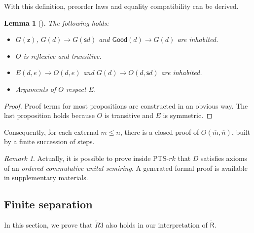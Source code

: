 \documentclass{article}
\newtheorem{lemma}{Lemma}
\theoremstyle{definition}
\theoremstyle{remark}
\newtheorem*{remark}{Remark}
\newcommand{\Rt}{\widetilde{\mathsf R}}
\newcommand{\Good}{\mathsf{Good}}
\newcommand{\z}{\mathsf z}
\newcommand{\suc}{\mathsf s}
\begin{document}
With this definition, preorder laws and equality
compatibility can be derived.

\begin{lemma}
    []
    \label{r-common}
    The following holds:
    \begin{itemize}
        \item $G(\z)$, $G(d)\to G(\suc d)$ and
            $\Good(d)\to G(d)$ are inhabited.
        \item $O$ is reflexive and transitive.
        \item $E(d,e)\to O(d,e)$ and
            $G(d)\to O(d,\suc d)$ are inhabited.
        \item Arguments of $O$ respect $E$.
    \end{itemize}
\end{lemma}
\begin{proof}
    Proof terms for most propositions are constructed
    in an obvious way. The last proposition holds
    because $O$ is transitive and $E$ is symmetric.
\end{proof}
Consequently, for each external $m\le n$, there is a
closed proof of $O(\overline{m},\overline{n})$, built
by a finite succession of steps.
\begin{remark}
    Actually, it is possible to prove inside PTS-$rk$
    that $D$ satisfies axioms of an \emph{ordered
    commutative unital semiring}. A generated formal
    proof is available in supplementary materials.
\end{remark}

\subsection{Finite separation}\label{finite-separation}

In this section, we prove that $\widetilde R3$ also
holds in our interpretation of $\Rt$.
\end{document}
